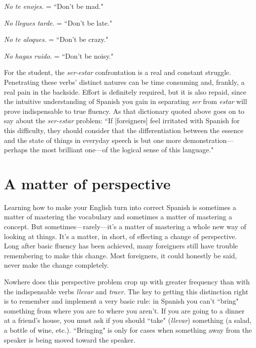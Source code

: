 \bsk

\indu \emph{No te enojes}. = ``Don't be mad."

\indu \emph{No llegues tarde}. = ``Don't be late."

\indu \emph{No te aloques}. = ``Don't be crazy."

\indu \emph{No hagas ruido}. = ``Don't be noisy."

\bsk

For the student, the \emph{ser-estar} confrontation is a real and constant struggle. Penetrating these verbs' distinct natures can be time consuming and, frankly, a real pain in the backside. Effort is definitely
required, but it is also repaid, since the intuitive understanding of
Spanish you gain in separating \emph{ser} from \emph{estar} will prove indispensable
to true fluency. As that dictionary quoted above goes on to say about
the \emph{ser-estar} problem: ``If [foreigners] feel irritated with Spanish for
this difficulty, they should consider that the differentiation between
the essence and the state of things in everyday speech is but one more
demonstration---perhaps the most brilliant one---of the logical sense
of this language."

\section{A matter of perspective}

Learning how to make your English turn into correct Spanish
is sometimes a matter of mastering the vocabulary and sometimes a
matter of mastering a concept. But sometimes---rarely---it's a matter of
mastering a whole new way of looking at things. It's a matter, in short,
of effecting a change of perspective. Long after basic fluency has been
achieved, many foreigners still have trouble remembering to make this
change. Most foreigners, it could honestly be said, never make the
change completely.

Nowhere does this perspective problem crop up with greater
frequency than with the indispensable verbs \emph{llevar} and \emph{traer}. The key
to getting this distinction right is to remember and implement a very
basic rule: in Spanish you can't ``bring" something from where you are
to where you aren't. If you are going to a dinner at a friend's house, you
must ask if you should ``take" (\emph{llevar}) something (a salad, a bottle of
wine, etc.). ``Bringing" is only for cases when something away from the
speaker is being moved toward the speaker.

